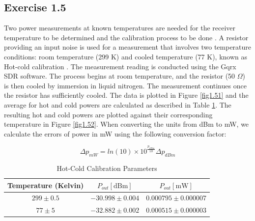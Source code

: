 \documentclass[12pt]{article}
\begin{document}
\subsection{Exercise 1.5}
Two power measurements at known temperatures are needed for the receiver temperature to be determined and the calibration process to be done \cite{klein}. A resistor providing an input noise is used for a measurement that involves two temperature conditions: room temperature (299 K) and cooled temperature (77 K), known as Hot-cold calibration \cite{klein}. The measurement reading is conducted using the Gqrx SDR software. The process begins at room temperature, and the resistor (50 $\Omega$) is then cooled by immersion in liquid nitrogen. The measurement continues once the resistor has sufficiently cooled. The  data is plotted in Figure \ref{fig1.51} and the average for hot and cold powers are calculated as described in Table \ref{T6}. The resulting hot and cold powers are plotted against their corresponding temperature in Figure \ref{fig1.52}. When converting the units from dBm to mW, we calculate the errors of power in mW using the following conversion factor:

\begin{equation}
\Delta p_{mW} = ln(10)\times 10^{\frac{p_{dBm}}{10}}
\Delta p_{dBm} 
\end{equation}


\begin{table}[H]
    \centering
    \caption{Hot-Cold Calibration Parameters}
    \label{T6}
    \begin{tabular}{c| c c}
        \hline
        \hline
        Temperature (Kelvin) & $P_{out}[\mathrm{dBm}]$ & $P_{out}[\mathrm{mW}]$ \\
        \hline
        
        $299 \pm 0.5$ & $-30.998 \pm 0.004$ & $0.000795 \pm 0.000007$\\
        $77 \pm 5$ & $-32.882 \pm 0.002$ & $0.000515 \pm 0.000003$\\
        \hline
    \end{tabular}

\end{table}
\end{document}
